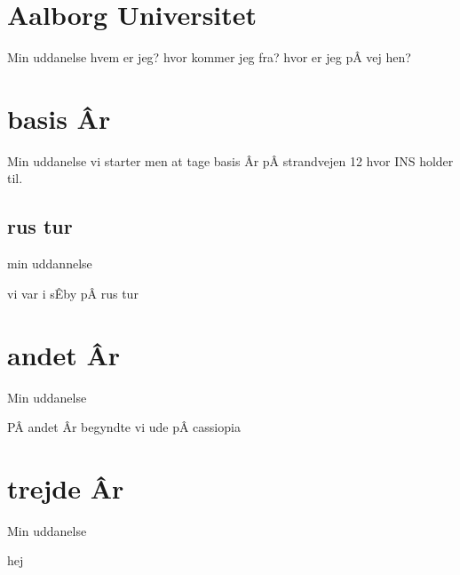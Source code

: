 \documentclass{beamer} %
\begin{document}

\section{Aalborg Universitet} %

\begin{frame}{Min uddanelse} %
	hvem er jeg?
	hvor kommer jeg fra?
	hvor er jeg pÂ vej hen?


\end{frame} %

\section{basis Âr}

\begin{frame}{Min uddanelse}
vi starter men at tage basis Âr pÂ strandvejen 12 hvor INS holder til. 

\end{frame}
\subsection{rus tur} %

\begin{frame}{min uddannelse}

vi var i sÊby pÂ rus tur 

\end{frame}

\section{andet Âr}

\begin{frame}{Min uddanelse}

PÂ andet Âr begyndte vi ude pÂ cassiopia

\end{frame}

\section{trejde Âr}

\begin{frame}{Min uddanelse}

hej

\end{frame}
\end{document}
